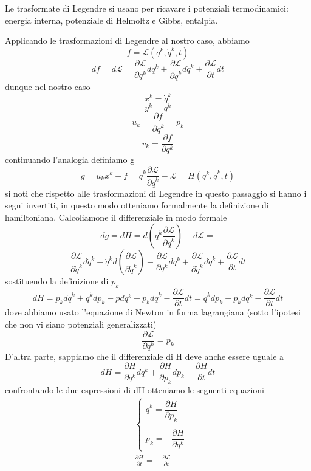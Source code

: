 \documentclass[
10pt, %
a4paper, %
oneside, %
headinclude,footinclude, %
BCOR5mm, %
]{scrartcl}
\begin{document}
\begin{osservazione}
	Le trasformate di Legendre si usano per ricavare i potenziali termodinamici: energia interna, potenziale di Helmoltz e Gibbs, entalpia.
\end{osservazione}
Applicando le trasformazioni di Legendre al nostro caso, abbiamo
\[f = \mathcal{L}(q^k, \dot{q}^k, t)\]
\[df =d\mathcal{L} =\frac{\partial \mathcal{L}}{\partial q^k}dq^k+\frac{\partial \mathcal{L}}{\partial\dot{ q}^k}d\dot{q}^k+\frac{\partial \mathcal{L}}{\partial t}dt\]
dunque nel nostro caso
\[x^k = \dot{q}^k\]
\[y^k = q^k\]
\[ u_k = \frac{\partial f}{\partial \dot{q}^k} = p_k\]
\[v_k = \frac{\partial f}{\partial q^k}\]
continuando l'analogia definiamo g
\[g = u_kx^k-f = \dot{q}^k\frac{\partial \mathcal{L}}{\partial \dot{q}^k}-\mathcal{L} = H(q^k, \dot{q}^k, t) \]
si noti che rispetto alle trasformazioni di Legendre in questo passaggio si hanno i segni invertiti, in questo modo otteniamo formalmente la definizione di hamiltoniana. Calcoliamone il differenziale in modo formale
\[dg = dH = d\left(\dot{q}^k\frac{\partial \mathcal{L}}{\partial \dot{q}^k}\right)-d\mathcal{L} = \]
\[\frac{\partial \mathcal{L}}{\partial \dot{q}^k}d\dot{q}^k+\dot{q}^k d\left(\frac{\partial \mathcal{L}}{\partial \dot{q}^k}\right)-\frac{\partial \mathcal{L}}{\partial q^k}dq^k+\frac{\partial \mathcal{L}}{\partial\dot{ q}^k}d\dot{q}^k+\frac{\partial \mathcal{L}}{\partial t}dt\]
sostituendo la definizione di \(p_k\)
\[dH =p_kd\dot{q}^k+\dot{q}^k dp_k-\dot{p}dq^k-p_kd\dot{q}^k-\frac{\partial \mathcal{L}}{\partial t}dt =\dot{q}^k dp_k-\dot{p}_kdq^k-\frac{\partial \mathcal{L}}{\partial t}dt \]
dove abbiamo usato l'equazione di Newton in forma lagrangiana (sotto l'ipotesi che non vi siano potenziali generalizzati)
\[\frac{\partial \mathcal{L}}{\partial q^k} = \dot{p}_k\]
D'altra parte, sappiamo che il differenziale di H deve anche essere uguale a 
\[dH = \frac{\partial H}{\partial q^k}dq^k+\frac{\partial H}{\partial p_k}dp_k+\frac{\partial H}{\partial t}dt\]
confrontando le due espressioni di dH otteniamo le seguenti equazioni
\begin{align*}
	&\begin{cases}
		\dot{q}^k = \dfrac{\partial H}{\partial p_k}\\\\
		\dot{p}_k = -\dfrac{\partial H}{\partial q^k}
	\end{cases}\\
	&\frac{\partial H}{\partial t} = -\frac{\partial \mathcal{L}}{\partial t}
\end{align*}
\end{document}
